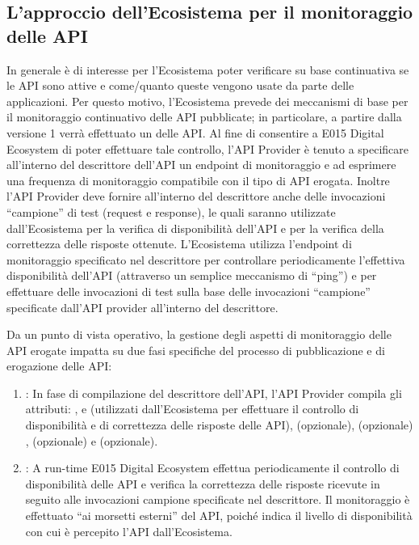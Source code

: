 \documentclass[letterpaper,10pt,italian]{sphinxmanual}
\begin{document}
\subsection{L’approccio dell’Ecosistema per il monitoraggio delle API}
\label{\detokenize{sez24:lapproccio-dellecosistema-per-il-monitoraggio-delle-api}}\label{\detokenize{sez24:sezione242}}
In generale è di interesse per l’Ecosistema poter verificare su base continuativa se le API sono attive e come/quanto queste vengono usate da parte delle applicazioni.
Per questo motivo, l’Ecosistema prevede dei meccanismi di base per il monitoraggio continuativo delle API pubblicate; in particolare, a partire dalla  versione 1 verrà effettuato un  delle API.
Al fine di consentire a E015 Digital Ecosystem di poter effettuare tale controllo, l’API Provider è tenuto a specificare all’interno del descrittore dell’API un endpoint di monitoraggio e ad esprimere una frequenza di monitoraggio compatibile con il tipo di API erogata.
Inoltre l’API Provider deve fornire all’interno del descrittore anche delle invocazioni “campione” di test (request e response), le quali saranno utilizzate dall’Ecosistema per la verifica di disponibilità dell’API e per la verifica della correttezza delle risposte ottenute.
L’Ecosistema utilizza l’endpoint di monitoraggio specificato nel descrittore per controllare periodicamente l’effettiva disponibilità dell’API (attraverso un semplice meccanismo di “ping”) e per effettuare delle invocazioni di test sulla base delle invocazioni “campione” specificate dall’API provider all’interno del descrittore.

Da un punto di vista operativo, la gestione degli aspetti di monitoraggio delle API erogate impatta su due fasi specifiche del processo di pubblicazione e di erogazione delle API:
\begin{enumerate}
\item {} 
: In fase di compilazione del descrittore dell’API, l’API Provider compila gli attributi: ,  e  (utilizzati dall’Ecosistema per effettuare il controllo di disponibilità e di correttezza delle risposte delle API),  (opzionale),  (opzionale) ,  (opzionale) e  (opzionale).

\item {} 
: A run-time E015 Digital Ecosystem effettua periodicamente il controllo di disponibilità delle API e verifica la correttezza delle risposte ricevute in seguito alle invocazioni campione specificate nel descrittore. Il monitoraggio è effettuato “ai morsetti esterni” del API, poiché indica il livello di disponibilità con cui è percepito l’API dall’Ecosistema.

\end{enumerate}
\end{document}
